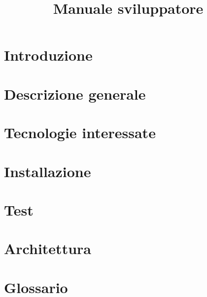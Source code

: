 \documentclass{article}
\title{Manuale sviluppatore}
\begin{document}


\section{Introduzione}%
\label{sec:introduzione}


\newpage
\section{Descrizione generale}%
\label{sec:descrizione_generale}


\newpage
\section{Tecnologie interessate}%
\label{sec:tecnologie_interessate}


\newpage
\section{Installazione}%
\label{sec:installazione}


\newpage
\section{Test}%
\label{sec:test}


\newpage
\section{Architettura}%
\label{sec:architettura}


% 

\newpage
\appendix
\setcounter{secnumdepth}{1} %
\section{Glossario}%
\label{sec:glossario}

\end{document}
